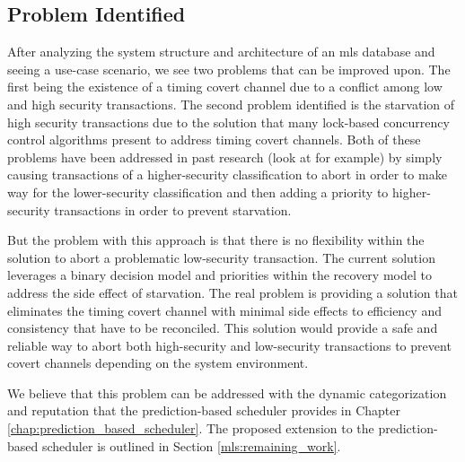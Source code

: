 \subsection{Problem Identified}
\label{mls:poblem_identified}
After analyzing the system structure and architecture of an \gls{mls} database and seeing a use-case scenario, we see two problems that can be improved upon. The first being the existence of a timing covert channel due to a conflict among low and high security transactions. The second problem identified is the starvation of high security transactions due to the solution that many lock-based concurrency control algorithms present to address timing covert channels. Both of these problems have been addressed in past research (look at \cite{samarati_database_2016} for example) by simply causing transactions of a higher-security classification to abort in order to make way for the lower-security classification and then adding a priority to higher-security transactions in order to prevent starvation.

But the problem with this approach is that there is no flexibility within the solution to abort a problematic low-security transaction. The current solution leverages a binary decision model and priorities within the recovery model to address the side effect of starvation. The real problem is providing a solution that eliminates the timing covert channel with minimal side effects to efficiency and consistency that have to be reconciled. This solution would provide a safe and reliable way to abort both high-security and low-security transactions to prevent covert channels depending on the system environment.

We believe that this problem can be addressed with the dynamic categorization and reputation that the prediction-based scheduler provides in Chapter \ref{chap:prediction_based_scheduler}. The proposed extension to the prediction-based scheduler is outlined in Section \ref{mls:remaining_work}.